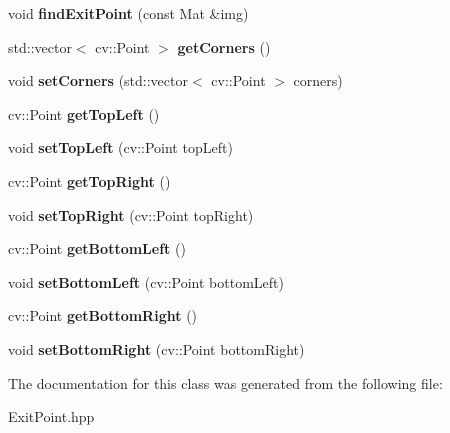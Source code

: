 \begin{DoxyCompactItemize}
\item 
\mbox{\label{class_exit_point_a2762c0c61bbe71a1a292b86e9517e860}} 
void {\bfseries find\+Exit\+Point} (const Mat \&img)
\item 
\mbox{\label{class_exit_point_ac26a595a35b370cf7375874395715af0}} 
std\+::vector$<$ cv\+::\+Point $>$ {\bfseries get\+Corners} ()
\item 
\mbox{\label{class_exit_point_aff4341c31734d77224b1251988949430}} 
void {\bfseries set\+Corners} (std\+::vector$<$ cv\+::\+Point $>$ corners)
\item 
\mbox{\label{class_exit_point_ad373de21603871832e10568631ef3cda}} 
cv\+::\+Point {\bfseries get\+Top\+Left} ()
\item 
\mbox{\label{class_exit_point_a31c88803968c8b215062b97b699721e2}} 
void {\bfseries set\+Top\+Left} (cv\+::\+Point top\+Left)
\item 
\mbox{\label{class_exit_point_a448716aa575ba751f72ab0f437b6a138}} 
cv\+::\+Point {\bfseries get\+Top\+Right} ()
\item 
\mbox{\label{class_exit_point_ae27c395eb18321cb120b99ffbed6028a}} 
void {\bfseries set\+Top\+Right} (cv\+::\+Point top\+Right)
\item 
\mbox{\label{class_exit_point_a51ac01267f39908e468ec859ba8d3096}} 
cv\+::\+Point {\bfseries get\+Bottom\+Left} ()
\item 
\mbox{\label{class_exit_point_a22bf3a433b3567d36463699e16aaa86b}} 
void {\bfseries set\+Bottom\+Left} (cv\+::\+Point bottom\+Left)
\item 
\mbox{\label{class_exit_point_a7a0e9d613aa361083bd4bf91f2080398}} 
cv\+::\+Point {\bfseries get\+Bottom\+Right} ()
\item 
\mbox{\label{class_exit_point_afe10f2b0cf00b654dc1c95183462ed1a}} 
void {\bfseries set\+Bottom\+Right} (cv\+::\+Point bottom\+Right)
\end{DoxyCompactItemize}


The documentation for this class was generated from the following file\+:\begin{DoxyCompactItemize}
\item 
Exit\+Point.\+hpp\end{DoxyCompactItemize}
